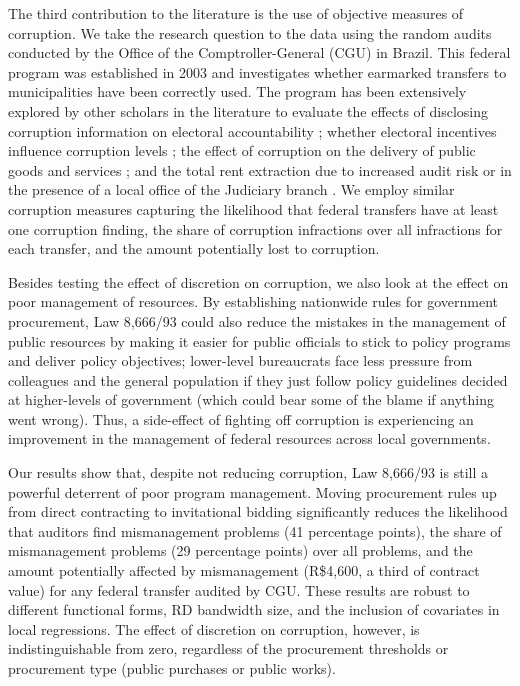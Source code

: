 \documentclass[11pt]{article}
\begin{document}
The third contribution to the literature is the use of objective measures of corruption. We take the research question to the data using the random audits conducted by the Office of the Comptroller-General (CGU) in Brazil. This federal program was established in 2003 and investigates whether earmarked  transfers to municipalities have been correctly used. The program has been extensively explored by other scholars in the literature to evaluate the effects of disclosing corruption information on electoral accountability \citep{FerrazExposingCorruptPoliticians2008b}; whether electoral incentives influence corruption levels \citep{FerrazElectoralAccountabilityCorruption2011a}; the effect of corruption on the delivery of public goods and services \citep{FerrazCorruptinglearningEvidence2012,LichandCorruptionGoodYour2017}; and the total rent extraction due to increased audit risk \citep{ZamboniAuditRiskRent2018} or in the presence of a local office of the Judiciary branch \citep{LitschigJudicialPresenceRent2015}. We employ similar corruption measures capturing the likelihood that federal transfers have at least one corruption finding, the share of corruption infractions over all infractions for each transfer, and the amount potentially lost to corruption.

Besides testing the effect of discretion on corruption, we also look at the effect on poor management of resources. By establishing nationwide rules for government procurement, Law 8,666/93 could also reduce the mistakes in the management of public resources by making it easier for public officials to stick to policy programs and deliver policy objectives; lower-level bureaucrats face less pressure from colleagues and the general population if they just follow policy guidelines decided at higher-levels of government (which could bear some of the blame if anything went wrong). Thus, a side-effect of fighting off corruption is experiencing an improvement in the management of federal resources across local governments.

Our results show that, despite not reducing corruption, Law 8,666/93 is still a powerful deterrent of poor program management. Moving procurement rules up from direct contracting to invitational bidding significantly reduces the likelihood that auditors find mismanagement problems (41 percentage points), the share of mismanagement problems (29 percentage points) over all problems, and the amount potentially affected by mismanagement (R\$4,600, a third of contract value) for any federal transfer audited by CGU. These results are robust to different functional forms, RD bandwidth size, and the inclusion of covariates in local regressions.  The effect of discretion on corruption, however, is indistinguishable from zero, regardless of the procurement thresholds or procurement type (public purchases or public works).
\end{document}
